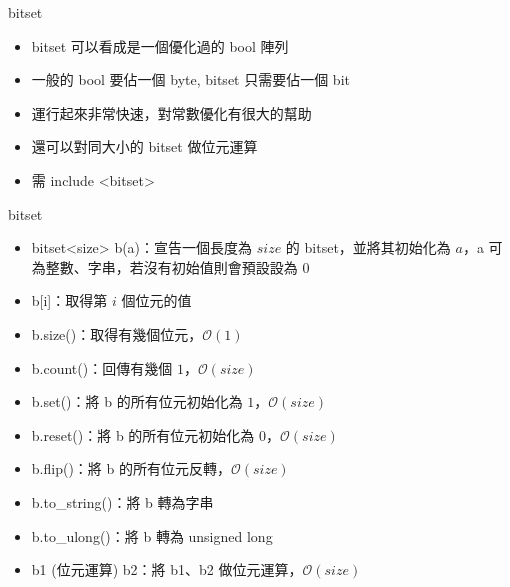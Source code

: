 \documentclass[aspectratio=169]{beamer}
\begin{document}
    \begin{frame}{bitset}
        \begin{itemize}
            \item<1-> bitset 可以看成是一個優化過的 bool 陣列
            \item<2-> 一般的 bool 要佔一個 byte, bitset 只需要佔一個 bit
            \item<2-> 運行起來非常快速，對常數優化有很大的幫助
            \item<2-> 還可以對同大小的 bitset 做位元運算
            \item<3-> 需 include <bitset>
        \end{itemize}
    \end{frame}

    \begin{frame}{bitset}
        \begin{itemize}
            \item<1-> bitset<size> b(a)：宣告一個長度為 $size$ 的 bitset，並將其初始化為 $a$，a 可為整數、字串，若沒有初始值則會預設設為 $0$
            \item<2-> b[i]：取得第 $i$ 個位元的值
            \item<3-> b.size()：取得有幾個位元，$\mathcal{O}(1)$
            \item<3-> b.count()：回傳有幾個 $1$，$\mathcal{O}(size)$
            \item<4-> b.set()：將 b 的所有位元初始化為 $1$，$\mathcal{O}(size)$
            \item<4-> b.reset()：將 b 的所有位元初始化為 $0$，$\mathcal{O}(size)$
            \item<5-> b.flip()：將 b 的所有位元反轉，$\mathcal{O}(size)$
            \item<6-> b.to\_string()：將 b 轉為字串
            \item<6-> b.to\_ulong()：將 b 轉為 unsigned long
            \item<7-> b1 (位元運算) b2：將 b1、b2 做位元運算，$\mathcal{O}(size)$
        \end{itemize}
    \end{frame}
\end{document}
